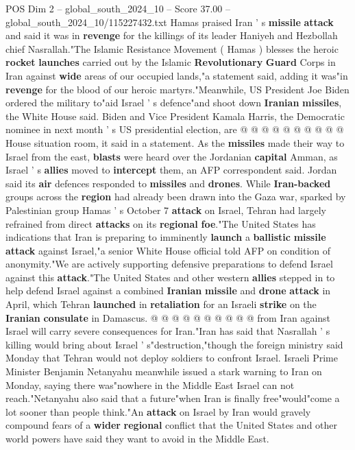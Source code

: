 \begin{textsample}{POS Dim 2 – global\_south\_2024\_10 – Score 37.00 – global\_south\_2024\_10/115227432.txt}
Hamas praised Iran ' s \textbf{missile} \textbf{attack} and said it was in \textbf{revenge} for the killings of its leader Haniyeh and Hezbollah chief Nasrallah."The Islamic Resistance Movement ( Hamas ) blesses the heroic \textbf{rocket} \textbf{launches} carried out by the Islamic \textbf{Revolutionary} \textbf{Guard} Corps in Iran against \textbf{wide} areas of our occupied lands,"a statement said, adding it was"in \textbf{revenge} for the blood of our heroic martyrs."Meanwhile, US President Joe Biden ordered the military to"aid Israel ' s defence"and shoot down \textbf{Iranian} \textbf{missiles}, the White House said.
Biden and Vice President Kamala Harris, the Democratic nominee in next month ' s US presidential election, are @ @ @ @ @ @ @ @ @ @ House situation room, it said in a statement.
As the \textbf{missiles} made their way to Israel from the east, \textbf{blasts} were heard over the Jordanian \textbf{capital} Amman, as Israel ' s \textbf{allies} moved to \textbf{intercept} them, an AFP correspondent said.
Jordan said its \textbf{air} defences responded to \textbf{missiles} and \textbf{drones}.
While \textbf{Iran-backed} groups across the \textbf{region} had already been drawn into the Gaza war, sparked by Palestinian group Hamas ' s October 7 \textbf{attack} on Israel, Tehran had largely refrained from direct \textbf{attacks} on its \textbf{regional} \textbf{foe}."The United States has indications that Iran is preparing to imminently \textbf{launch} a \textbf{ballistic} \textbf{missile} \textbf{attack} against Israel,"a senior White House official told AFP on condition of anonymity."We are actively supporting defensive preparations to defend Israel against this \textbf{attack}."The United States and other western \textbf{allies} stepped in to help defend Israel against a combined \textbf{Iranian} \textbf{missile} and \textbf{drone} \textbf{attack} in April, which Tehran \textbf{launched} in \textbf{retaliation} for an Israeli \textbf{strike} on the \textbf{Iranian} \textbf{consulate} in Damascus. @ @ @ @ @ @ @ @ @ @ from Iran against Israel will carry severe consequences for Iran."Iran has said that Nasrallah ' s killing would bring about Israel ' s"destruction,"though the foreign ministry said Monday that Tehran would not deploy soldiers to confront Israel.
Israeli Prime Minister Benjamin Netanyahu meanwhile issued a stark warning to Iran on Monday, saying there was"nowhere in the Middle East Israel can not reach."Netanyahu also said that a future"when Iran is finally free"would"come a lot sooner than people think."An \textbf{attack} on Israel by Iran would gravely compound fears of a \textbf{wider} \textbf{regional} conflict that the United States and other world powers have said they want to avoid in the Middle East.

\end{textsample}

